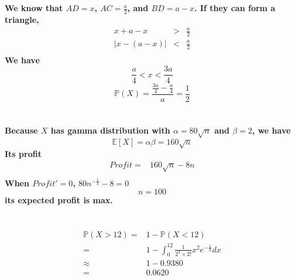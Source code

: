 \documentclass{article}
\begin{document}
    \section{} 
        \paragraph{
            We know that $AD=x$, $AC=\frac{a}{2}$, and $BD=a-x$. If they can form a triangle,
            \begin{equation*}
                \begin{aligned}
                    x+a-x&>&\frac{a}{2}\\
                    |x-(a-x)|&<&\frac{a}{2}\\
                \end{aligned} 
            \end{equation*}
            We have
            $$\frac{a}{4}<x<\frac{3a}{4}$$
            $$\mathbb{P}(X)=\frac{\frac{3a}{4}-\frac{a}{4}}{a}=\frac{1}{2}$$
        }
    \section{}
        \paragraph{
            Because $X$ has gamma distribution with $\alpha=80\sqrt{n}$ and $\beta=2$, we have 
            $$\mathbb{E}[X]=\alpha\beta=160\sqrt{n}$$
            Its profit
            \begin{equation*}
                \begin{split}
                    Profit=&160\sqrt{n}-8n\\
                \end{split}
            \end{equation*}
            When $Profit'=0$, $80n^{-\frac{1}{2}}-8=0$
            $$n=100$$
            its expected profit is max.
        }

    \section{}
        \begin{equation*}
            \begin{split}
                \mathbb{P}(X>12)=&1-\mathbb{P}(X<12)\\
                    =&1-\int _0 ^{12} \frac{1}{2^3\times 2!}x^2e^{-\frac{x}{2}}dx\\
                    \approx&1-0.9380\\
                    =&0.0620
            \end{split}
        \end{equation*}
\end{document}
